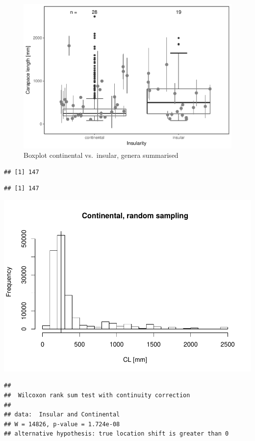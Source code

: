 \documentclass[]{article}
\begin{document}
\begin{figure}[htbp]
\centering
\includegraphics{MA_JJ_files/figure-latex/BPCI-1.pdf}
\caption{Boxplot continental vs.~insular, genera summarised}
\end{figure}

\begin{verbatim}
## [1] 147
\end{verbatim}

\begin{verbatim}
## [1] 147
\end{verbatim}

\includegraphics{MA_JJ_files/figure-latex/RSCI-1.pdf}

\begin{verbatim}
## 
##  Wilcoxon rank sum test with continuity correction
## 
## data:  Insular and Continental
## W = 14826, p-value = 1.724e-08
## alternative hypothesis: true location shift is greater than 0
\end{verbatim}
\end{document}
